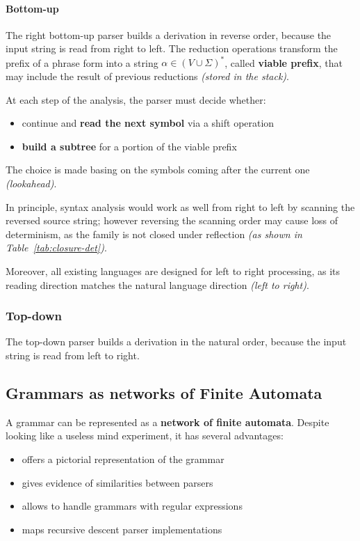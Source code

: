 \documentclass[english]{article}
\begin{document}
\paragraph{Bottom-up}

The right bottom-up parser builds a derivation in reverse order, because the input string is read from right to left.
The reduction operations transform the prefix of a phrase form into a string \(\alpha \in \left( V \cup \Sigma \right)^\ast\), called \textbf{viable prefix}, that may include the result of previous reductions \textit{(stored in the stack)}.

At each step of the analysis, the parser must decide whether:

\begin{itemize}
  \item continue and \textbf{read the next symbol} via a shift operation
  \item \textbf{build a subtree} for a portion of the viable prefix
\end{itemize}

The choice is made basing on the symbols coming after the current one \textit{(lookahead)}.

\bigskip
In principle, syntax analysis would work as well from right to left by scanning the reversed source string;
however reversing the scanning order may cause loss of determinism, as the \DET family is not closed under reflection \textit{(as shown in Table~\ref{tab:closure-det})}.

Moreover, all existing languages are designed for left to right processing, as its reading direction matches the natural language direction \textit{(left to right)}.

\subsubsection{Top-down}

The top-down parser builds a derivation in the natural order, because the input string is read from left to right.

\subsection{Grammars as networks of Finite Automata}

A grammar can be represented as a \textbf{network of finite automata}.
Despite looking like a useless mind experiment, it has several advantages:

\begin{itemize}
  \item offers a pictorial representation of the grammar
  \item gives evidence of similarities between parsers
  \item allows to handle grammars with regular expressions
  \item maps recursive descent parser implementations
\end{itemize}
\end{document}

